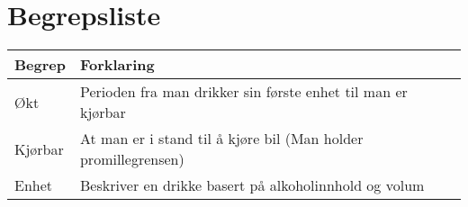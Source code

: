 \section{Begrepsliste}
\begin{tabular}{ | m{4cm} | m{12cm} | } 
    \hline
    \textbf{Begrep} & \textbf{Forklaring} \\
    \hline
    Økt & Perioden fra man drikker sin første enhet til man er kjørbar \\
    \hline
    Kjørbar & At man er i stand til å kjøre bil (Man holder promillegrensen) \\
    \hline
    Enhet & Beskriver en drikke basert på alkoholinnhold og volum \\
    \hline
  \end{tabular}